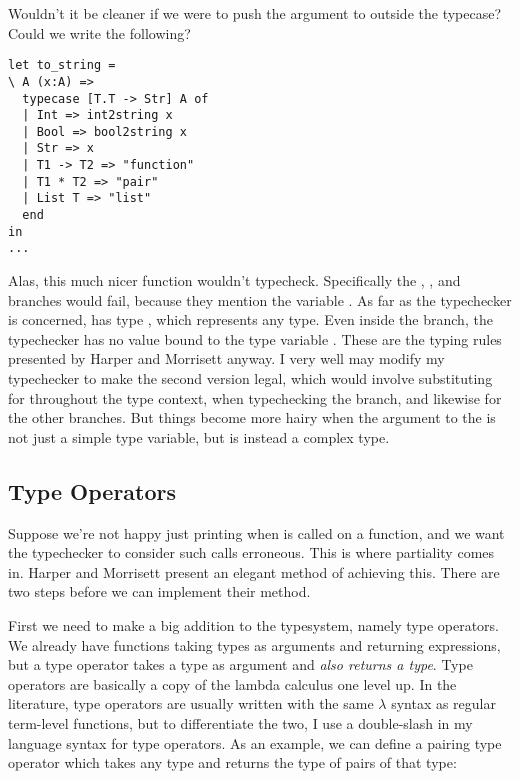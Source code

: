 \documentclass[pageno]{jpaper}
\begin{document}
{{{%

Wouldn't it be cleaner if we were to push the argument to  outside the typecase?
Could we write the following?

\begin{lstlisting}[mathescape]
let to_string = 
\ A (x:A) =>
  typecase [T.T -> Str] A of
  | Int => int2string x
  | Bool => bool2string x
  | Str => x
  | T1 -> T2 => "function"
  | T1 * T2 => "pair"
  | List T => "list"
  end
in
...
\end{lstlisting}

Alas, this much nicer function wouldn't typecheck. Specifically the , ,
and  branches would fail, because they mention the variable . As far as the typechecker is concerned,  has type , which represents any type. Even inside the  branch,
the typechecker has no value bound to the type variable . These are the typing rules presented by
Harper and Morrisett anyway. I very well may modify my typechecker to make the second version legal,
which would involve substituting  for  throughout the type context, when typechecking
the  branch, and likewise for the other branches. But things become more hairy when
the argument to the  is not just a simple type variable, but is instead a complex
type. 

\subsection{Type Operators}

Suppose we're not happy just printing  when  is called on a function,
and we want the typechecker to consider such calls erroneous.  This is where partiality comes in.
Harper and Morrisett present an elegant method of achieving this. There are two steps before
we can implement their method.

First we need to make a big addition to the typesystem, namely type operators.
We already have functions taking types as arguments and returning expressions, but a type operator takes
a type as argument and \textit{also returns a type}.
Type operators are basically a copy of the lambda calculus one level up.  In the literature, type operators are usually written with the same $\lambda$ syntax as regular term-level functions, but to differentiate the two, I use a double-slash \lsti{\\} in my language syntax for type operators. As an example, we can define
a pairing type operator which takes any type and returns the type of pairs of that type:

}}}
\end{document}
